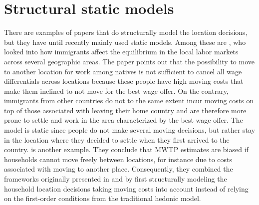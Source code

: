 \section{Structural static models}
There are examples of papers that do structurally model the location decisions, but they have until recently mainly used static models. Among these are \citet{Borjas2000}, who looked into how immigrants affect the equilibrium in the local labor markets across several geographic areas. The paper points out that the possibility to move to another location for work among natives is not sufficient to cancel all wage differentials across locations because these people have high moving costs that make them inclined to not move for the best wage offer. On the contrary, immigrants from other countries do not to the same extent incur moving costs on top of those associated with leaving their home country and are therefore more prone to settle and work in the area characterized by the best wage offer. The model is static since people do not make several moving decisions, but rather stay in the location where they decided to settle when they first arrived to the country. \citet{Bayeretal2009} is another example. They conclude that MWTP estimates are biased if households cannot move freely between locations, for instance due to costs associated with moving to another place. Consequently, they combined the frameworks originally presented in \citet{McFadden1978} and \citet{Rosen1974} by first structurally modeling the household location decisions taking moving costs into account instead of relying on the first-order conditions from the traditional hedonic model.  

